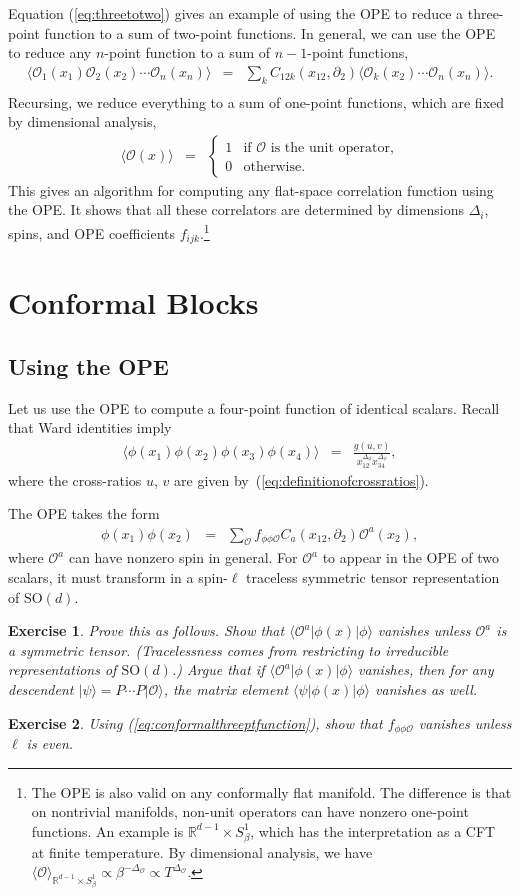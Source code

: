 \documentclass[11pt]{ws-rv9x6}
\newcommand\be{\begin{eqnarray}}
\newcommand\ee{\end{eqnarray}}
\newcommand\f\phi
\newcommand\cO{\mathcal{O}}
\newcommand\ptl\partial
\newcommand\<\langle
\renewcommand\>\rangle
\newcommand\R{\mathbb{R}}
\newcommand\nn{\nonumber}
\renewcommand\.{\cdot}
\newcommand\x\times
\newcommand\SO{\mathrm{SO}}
\newcommand\De{\Delta}
\renewcommand\b\beta
\newtheorem{exercise}{Exercise}[section]
\begin{document}
Equation (\ref{eq:threetotwo}) gives an example of using the OPE to reduce a three-point function to a sum of two-point functions.  In general, we can use the OPE to reduce any $n$-point function to a sum of $n-1$-point functions,
\be
\<\cO_1(x_1)\cO_2(x_2)\cdots\cO_n(x_n)\> &=& \sum_k C_{12k}(x_{12},\ptl_2)\<\cO_k(x_2)\cdots\cO_n(x_n)\>.\nn\\
\ee
Recursing, we reduce everything to a sum of one-point functions, which are fixed by dimensional analysis,
\be
\<\cO(x)\> &=& \begin{cases}
1 & \textrm{if $\cO$ is the unit operator,}\\
0 & \textrm{otherwise.}
\end{cases}
\ee
This gives an algorithm for computing any flat-space correlation function using the OPE\@.  It shows that all these correlators are determined by dimensions $\De_i$, spins, and OPE coefficients $f_{ijk}$.\footnote{The OPE is also valid on any conformally flat manifold.  The difference is that on nontrivial manifolds, non-unit operators can have nonzero one-point functions.  An example is $\R^{d-1}\x S^1_\b$, which has the interpretation as a CFT at finite temperature.  By dimensional analysis, we have $\<\cO\>_{\R^{d-1}\x S^1_\b}\propto \b^{-\De_\cO}\propto T^{\De_\cO}$.\label{foot:finitetemperature}}

\section{Conformal Blocks}

\subsection{Using the OPE}

Let us use the OPE to compute a four-point function of identical scalars.  Recall that Ward identities imply
\be
\<\f(x_1)\f(x_2)\f(x_3)\f(x_4)\> &=& \frac{g(u,v)}{x_{12}^{\De_\f}x_{34}^{\De_\f}},
\ee
where the cross-ratios $u$, $v$ are given by~(\ref{eq:definitionofcrossratios}).

The OPE takes the form
\be
\label{eq:scalarscalarOPE}
\f(x_1)\f(x_2) &=& \sum_\cO f_{\f\f\cO} C_{a}(x_{12},\ptl_2)\cO^{a}(x_2),
\ee
where $\cO^{a}$ can have nonzero spin in general.  For $\cO^a$ to appear in the OPE of two scalars, it must transform in a spin-$\ell$ traceless symmetric tensor representation of $\SO(d)$.
\begin{exercise}
Prove this as follows. Show that $\<\cO^a|\f(x)|\f\>$ vanishes unless $\cO^a$ is a symmetric tensor.  (Tracelessness comes from restricting to irreducible representations of $\SO(d)$.) Argue that if $\<\cO^a|\f(x)|\f\>$ vanishes, then for any descendent $|\psi\>=P\cdots P|\cO\>$, the matrix element $\<\psi|\f(x)|\f\>$ vanishes as well.
\end{exercise}
\begin{exercise}
\label{exercise:elleven}
Using (\ref{eq:conformalthreeptfunction}), show that $f_{\f\f\cO}$ vanishes unless $\ell$ is even.
\end{exercise}
\end{document}
